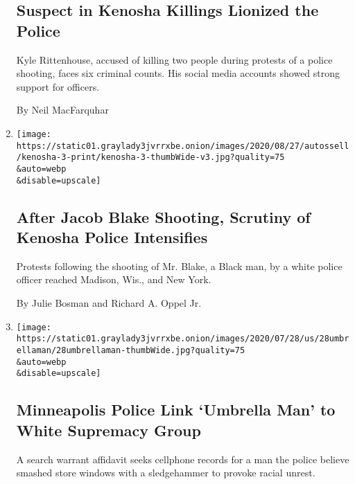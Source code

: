 \begin{enumerate}
  \hypertarget{suspect-in-kenosha-killings-lionized-the-police}{%
  \subsection{Suspect in Kenosha Killings Lionized the
  Police}\label{suspect-in-kenosha-killings-lionized-the-police}}

  Kyle Rittenhouse, accused of killing two people during protests of a
  police shooting, faces six criminal counts. His social media accounts
  showed strong support for officers.

  By Neil MacFarquhar
\item
  \href{/2020/08/25/us/jacob-blake-kenosha-fires.html}{}

  \texttt{[image: https://static01.graylady3jvrrxbe.onion/images/2020/08/27/autossell/kenosha-3-print/kenosha-3-thumbWide-v3.jpg?quality=75\\\&auto=webp\\\&disable=upscale]}

  \hypertarget{after-jacob-blake-shooting-scrutiny-of-kenosha-police-intensifies}{%
  \subsection{After Jacob Blake Shooting, Scrutiny of Kenosha Police
  Intensifies}\label{after-jacob-blake-shooting-scrutiny-of-kenosha-police-intensifies}}

  Protests following the shooting of Mr. Blake, a Black man, by a white
  police officer reached Madison, Wis., and New York.

  By Julie Bosman and Richard A. Oppel Jr.
\item
  \href{/2020/07/28/us/umbrella-man-identified-minneapolis.html}{}

  \texttt{[image: https://static01.graylady3jvrrxbe.onion/images/2020/07/28/us/28umbrellaman/28umbrellaman-thumbWide.jpg?quality=75\\\&auto=webp\\\&disable=upscale]}

  \hypertarget{minneapolis-police-link-umbrella-man-to-white-supremacy-group}{%
  \subsection{Minneapolis Police Link `Umbrella Man' to White Supremacy
  Group}\label{minneapolis-police-link-umbrella-man-to-white-supremacy-group}}

  A search warrant affidavit seeks cellphone records for a man the
  police believe smashed store windows with a sledgehammer to provoke
  racial unrest.


\end{enumerate}
